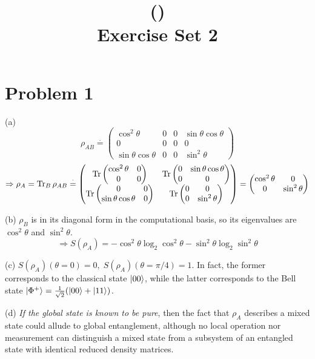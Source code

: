 \documentclass[11pt]{article}
\title{\coursename (\coursecode)\\Exercise Set 2}
\author{\studentname}
\date{\semester}
\begin{document}
\maketitle

\section*{Problem 1}
\noindent
(a)
\[
    \rho_{AB} \overset{\cdot}{=} \begin{pmatrix}
        \cos^2\theta & 0 & 0 & \sin\theta\cos\theta \\
        0 & 0 & 0 & 0 \\
        \sin\theta\cos\theta & 0 & 0 & \sin^2\theta
    \end{pmatrix}
\]
\[
    \Rightarrow \rho_A = \operatorname{Tr}_B \rho_{AB} \overset{\cdot}{=} \begin{pmatrix}
        \operatorname{Tr} \begin{pmatrix} \cos^2\theta & 0 \\ 0 & 0 \end{pmatrix} &
        \operatorname{Tr} \begin{pmatrix} 0 & \sin\theta\cos\theta \\ 0 & 0 \end{pmatrix} \\
        \operatorname{Tr} \begin{pmatrix} 0 & 0 \\ \sin\theta\cos\theta & 0 \end{pmatrix} &
        \operatorname{Tr} \begin{pmatrix} 0 & 0 \\ 0 & \sin^2\theta \end{pmatrix}
    \end{pmatrix} = \begin{pmatrix}
        \cos^2\theta & 0 \\ 0 & \sin^2\theta
    \end{pmatrix}
\]

\noindent
(b) $\rho_B$ is in its diagonal form in the computational basis,
so its eigenvalues are $\cos^2\theta$ and $\sin^2\theta$.
\[
    \Rightarrow S(\rho_A) = -\cos^2\theta\log_2\cos^2\theta - \sin^2\theta\log_2\sin^2\theta
\]

\noindent
(c) $S(\rho_A)(\theta=0) = 0,\; S(\rho_A)(\theta=\pi/4) = 1$.
In fact, the former corresponds to the classical state $\ket{00}$,
while the latter corresponds to the Bell state
$\ket{\Phi^+} = \frac{1}{\sqrt{2}} (\ket{00} + \ket{11})$.

\noindent
(d) \emph{If the global state is known to be pure}, then the fact that
$\rho_A$ describes a mixed state could allude to global entanglement,
although no local operation nor measurement can distinguish a mixed state
from a subsystem of an entangled state with identical reduced density matrices.
\end{document}
